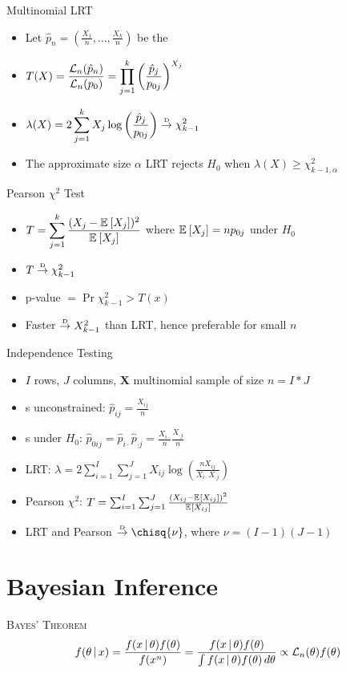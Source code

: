 \documentclass[landscape]{article}
\begin{document}
\begin{multicols*}{2}
Multinomial LRT
\begin{itemize}
  \item Let 
    $\hat p_n = \displaystyle \left(\frac{X_1}{n},\dots,\frac{X_k}{n}\right)$ 
    be the \mle
 \item $T(X) = \displaystyle \frac{\mathcal{L}_n(\hat p_n)}{\mathcal{L}_n(p_0)}
   = \prod_{j=1}^k \left( \frac{\hat p_j}{p_{0j}} \right)^{X_j}$
 \item $\lambda(X) = \displaystyle 2\sum_{j=1}^k X_j \log 
    \left( \frac{\hat p_j}{p_{0j}} \right) \stackrel{\text{\tiny{D}}}{\rightarrow} \chi_{k-1}^2$ 
 \item The approximate size $\alpha$ LRT rejects $H_0$ when 
   $\lambda(X) \ge \chi_{k-1,\alpha}^2$
\end{itemize}

Pearson $\chi^2$ Test
\begin{itemize}
  \item $T = \displaystyle \sum_{j=1}^k \frac{(X_j-\mathbb{E}_{}\left[X_j\right])^2}{\mathbb{E}_{}\left[X_j\right]}$
    where $\mathbb{E}_{}\left[X_j\right] = np_{0j}$ under $H_0$
  \item $T \stackrel{\text{\tiny{D}}}{\rightarrow} \chi_{k-1}^2$ 
  \item p-value $= \Pr{\chi_{k-1}^2 > T(x)}$
  \item Faster $\stackrel{\text{\tiny{D}}}{\rightarrow} X_{k-1}^2$ than LRT, hence preferable for small $n$
\end{itemize}

Independence Testing 
\begin{itemize}
  \item $I$ rows, $J$ columns, $\mathbf{X}$ multinomial sample of size $n=I*J$
  \item {\mle}s unconstrained: $\hat p_{ij} = \frac{X_{ij}}{n}$
  \item {\mle}s under $H_0$: $\hat p_{0ij} = \hat p_{i\cdot}\hat p_{\cdot j}
    = \frac{X_{i\cdot}}{n} \frac{X_{\cdot j}}{n}$
  \item LRT: $\lambda = 2\sum_{i=1}^I\sum_{j=1}^J X_{ij} 
    \log\left( \frac{nX_{ij}}{X_{i\cdot}X_{\cdot j}}\right)$
  \item Pearson $\chi^2$: $T = \sum_{i=1}^I\sum_{j=1}^J 
    \frac{(X_{ij}-\mathbb{E}_{}\left[X_{ij}\right])^2}{\mathbb{E}_{}\left[X_{ij}\right]}$
  \item LRT and Pearson $\dconv \chisq{\nu}$, where $\nu=(I-1)(J-1)$
\end{itemize}

\section{Bayesian Inference}

\textsc{Bayes' Theorem}
$$f(\theta\,|\, x) 
= \frac{f(x\,|\,\theta)f(\theta)}{f(x^n)}
= \frac{f(x\,|\,\theta)f(\theta)}
       {\int f(x\,|\,\theta)f(\theta)\,d\theta} \propto \mathcal{L}_n(\theta)f(\theta)$$


\end{multicols*}
\end{document}

